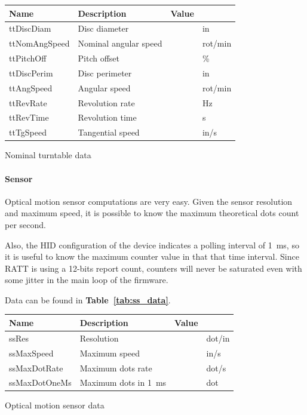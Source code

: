 \documentclass[a4paper,10pt]{article}
\makeatletter
\newenvironment{tablehere}{\def\@captype{table}\vspace{2ex}}{\vspace{2ex}}
\newcommand{\citet}[1]{\textbf{Table~\ref{#1}}}
\makeatother
\begin{document}
\begin{multicols}{2}
\begin{tablehere}
\centering \footnotesize
\begin{tabular}{|l|l|rl|}
\hline
\textbf{Name} & \textbf{Description} & \textbf{Value} &	\\
\hline
ttDiscDiam		& Disc diameter			& \ttDiscDiam		& in			\\
ttNomAngSpeed	& Nominal angular speed	& \ttNomAngSpeed	& rot/min		\		& Pitch offset			& \ttPitchOff		& \%			\\
\hline
ttDiscPerim		& Disc perimeter		& \ttDiscPerim		& in			\		& Angular speed			& \ttAngSpeed		& rot/min		\		& Revolution rate		& \ttRevRate		& Hz			\		& Revolution time		& \ttRevTime		& s				\		& Tangential speed		& \ttTgSpeed		& in/s			\\
\hline
\end{tabular}
\caption{Nominal turntable data}
\label{tab:tt_data_nom}
\end{tablehere}


\paragraph{Sensor}
Optical motion sensor computations are very easy. Given the sensor resolution
and maximum speed, it is possible to know the maximum theoretical dots count
per second.

Also, the HID configuration of the device indicates a polling interval of
1~ms, so it is useful to know the maximum counter value in that that time
interval. Since RATT is using a 12-bits report count, counters will never be
saturated even with some jitter in the main loop of the firmware.

Data can be found in \citet{tab:ss_data}.

\begin{tablehere}
\centering \footnotesize
\begin{tabular}{|l|l|rl|}
\hline
\textbf{Name} & \textbf{Description} & \textbf{Value} &	\\
\hline
ssRes			& Resolution			& \ssRes			& dot/in		\		& Maximum speed			& \ssMaxSpeed		& in/s			\\
\hline	
ssMaxDotRate	& Maximum dots rate		& \ssMaxDotRate		& dot/s			\\
ssMaxDotOneMs	& Maximum dots in 1~ms	& \ssMaxDotsOneMs	& dot			\\
\hline
\end{tabular}
\caption{Optical motion sensor data}
\label{tab:ss_data}
\end{tablehere}



\end{multicols}
\end{document}
